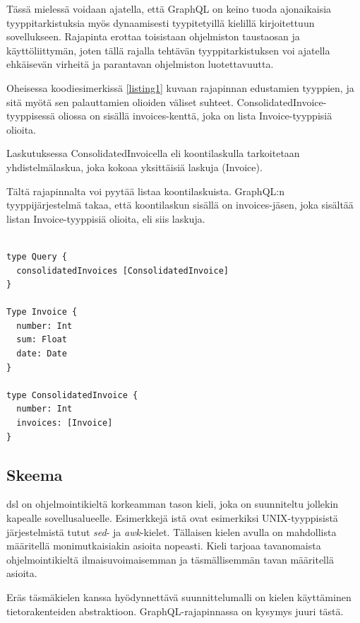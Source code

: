 Tässä mielessä voidaan ajatella, että GraphQL on keino tuoda
ajonaikaisia tyyppitarkistuksia myös dynaamisesti tyypitetyillä kielillä
kirjoitettuun sovellukseen. Rajapinta erottaa toisistaan ohjelmiston
taustaosan ja käyttöliittymän, joten tällä rajalla tehtävän
tyyppitarkistuksen voi ajatella ehkäisevän virheitä ja parantavan
ohjelmiston luotettavuutta.

Oheisessa koodiesimerkissä \ref{listing1} kuvaan rajapinnan edustamien
tyyppien, ja sitä myötä sen palauttamien olioiden väliset suhteet.
ConsolidatedInvoice-tyyppisessä oliossa on sisällä invoices-kenttä, joka
on lista Invoice-tyyppisiä olioita.

Laskutuksessa ConsolidatedInvoicella eli koontilaskulla tarkoitetaan
yhdistelmälaskua, joka kokoaa yksittäisiä laskuja (Invoice).

Tältä rajapinnalta voi pyytää listaa koontilaskuista. GraphQL:n
tyyppijärjestelmä takaa, että koontilaskun sisällä on invoices-jäsen,
joka sisältää listan Invoice-tyyppisiä olioita, eli siis laskuja.

\begin{code}
  \begin{verbatim}

type Query {
  consolidatedInvoices [ConsolidatedInvoice]
}

Type Invoice {
  number: Int
  sum: Float
  date: Date
}

type ConsolidatedInvoice {
  number: Int
  invoices: [Invoice]
}
  \end{verbatim}
  \label{listing1}
\end{code}

\hypertarget{skeema}{%
\subsection{Skeema}\label{skeema}}

\Gls{dsl} on ohjelmointikieltä korkeamman tason kieli, joka on
suunniteltu jollekin kapealle sovellusalueelle.\cite{landin1966next}
Esimerkkejä istä ovat esimerkiksi UNIX-tyyppisistä
järjestelmistä tutut \emph{sed}- ja \emph{awk}-kielet. Tällaisen kielen
avulla on mahdollista määritellä monimutkaisiakin asioita
nopeasti.\cite{Raymond2003} Kieli tarjoaa tavanomaista ohjelmointikieltä
ilmaisuvoimaisemman ja täsmällisemmän tavan määritellä asioita.

Eräs täsmäkielen kanssa hyödynnettävä suunnittelumalli on kielen
käyttäminen tietorakenteiden abstraktioon.\cite{Spi00b}
GraphQL-rajapinnassa on kysymys juuri tästä.

